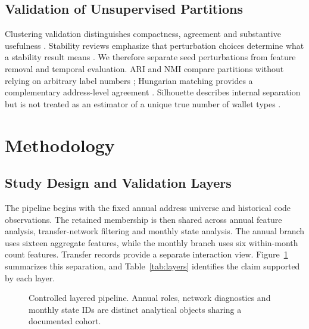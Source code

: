\subsection{Validation of Unsupervised Partitions}
Clustering validation distinguishes compactness, agreement and substantive usefulness \cite{halkidi2001validation}. Stability reviews emphasize that perturbation choices determine what a stability result means \cite{liu2022stability}. We therefore separate seed perturbations from feature removal and temporal evaluation. ARI and NMI compare partitions without relying on arbitrary label numbers \cite{hubert1985partitions,vinh2010information}; Hungarian matching provides a complementary address-level agreement \cite{kuhn1955hungarian}. Silhouette describes internal separation but is not treated as an estimator of a unique true number of wallet types \cite{rousseeuw1987silhouettes}.

\section{Methodology}
\subsection{Study Design and Validation Layers}
The pipeline begins with the fixed annual address universe and historical code observations. The retained membership is then shared across annual feature analysis, transfer-network filtering and monthly state analysis. The annual branch uses sixteen aggregate features, while the monthly branch uses six within-month count features. Transfer records provide a separate interaction view. Figure~\ref{fig:pipeline} summarizes this separation, and Table~\ref{tab:layers} identifies the claim supported by each layer.

\begin{figure}[t]
\centering
{}
\caption{Controlled layered pipeline. Annual roles, network diagnostics and monthly state IDs are distinct analytical objects sharing a documented cohort.}
\label{fig:pipeline}
\end{figure}

